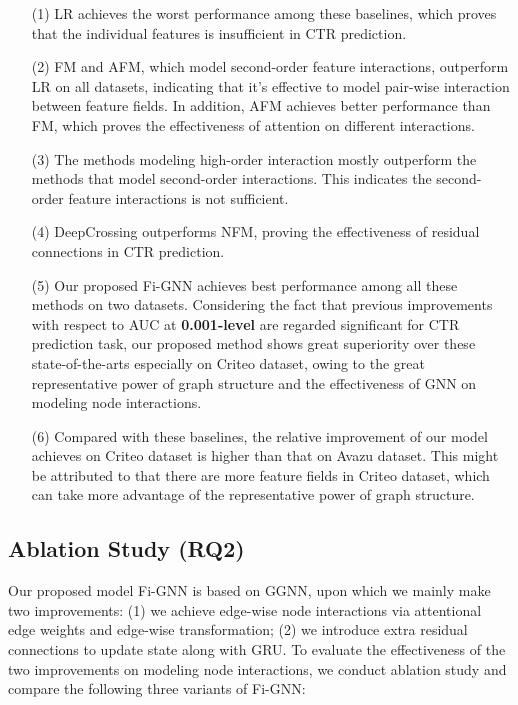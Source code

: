 \documentclass[sigconf]{acmart}
\begin{document}
\begin{itemize}
\item[(1)]
LR achieves the worst performance among these baselines, which proves that the individual features is insufficient in CTR prediction.
\item[(2)]
FM and AFM, which model second-order feature interactions, outperform LR on all datasets, indicating that it's effective to model pair-wise interaction between feature fields. 
In addition, AFM achieves better performance than FM, which proves the effectiveness of attention on different interactions.
\item[(3)]
The methods modeling high-order interaction mostly outperform the methods that model second-order interactions.
This indicates the second-order feature interactions is not sufficient. 
\item[(4)]
DeepCrossing outperforms NFM, proving the effectiveness of residual connections in CTR prediction.
\item[(5)]
Our proposed Fi-GNN achieves best performance among all these methods on two datasets.
Considering the fact that previous improvements with respect to AUC at \textbf{0.001-level} are regarded significant for CTR prediction task, our proposed method shows great superiority over these state-of-the-arts especially on Criteo dataset, owing to the great representative power of graph structure and the effectiveness of GNN on modeling node interactions.
\item[(6)] Compared with these baselines, the relative improvement of our model achieves on Criteo dataset is higher than that on Avazu dataset. This might be attributed to that there are more feature fields in Criteo dataset, which can take more advantage of the representative power of graph structure.
\end{itemize}



\subsection{Ablation Study (RQ2)}\label{sect:comp_gnn}

Our proposed model Fi-GNN is based on GGNN, upon which we mainly make two improvements:
(1) we achieve edge-wise node interactions via attentional edge weights and edge-wise transformation;
(2) we introduce extra residual connections to update state along with GRU.
To evaluate the effectiveness of the two improvements on modeling node interactions, we conduct ablation study and compare the following three variants of Fi-GNN:
\end{document}
